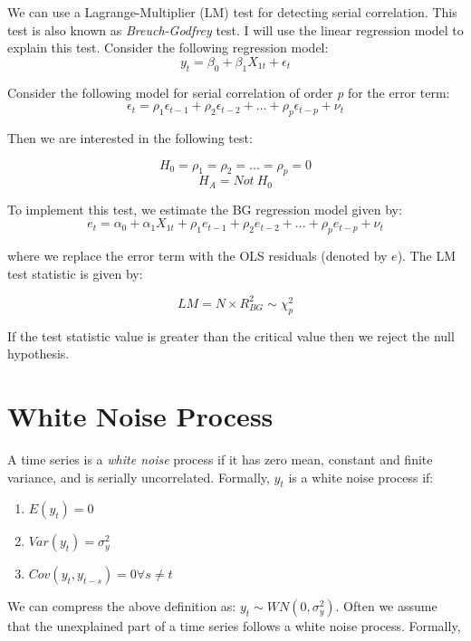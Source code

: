 \documentclass[]{book}
\providecommand{\tightlist}{%
  \setlength{\itemsep}{0pt}\setlength{\parskip}{0pt}}
\theoremstyle{definition}
\theoremstyle{definition}
\theoremstyle{definition}
\theoremstyle{remark}
\begin{document}
We can use a Lagrange-Multiplier (LM) test for detecting serial correlation. This test is also known as \emph{Breuch-Godfrey} test. I will use the linear regression model to explain this test. Consider the following regression model:
\begin{equation}
y_t=\beta_0 + \beta_1 X_{1t}+\epsilon_t
\end{equation}

Consider the following model for serial correlation of order \emph{p} for the error term:
\begin{equation}
\epsilon_t=\rho_1 \epsilon_{t-1}+\rho_2 \epsilon_{t-2}+...+ \rho_p \epsilon_{t-p}+\nu_t
\label{eq:bg}
\end{equation}

Then we are interested in the following test:

\[H_0=\rho_1=\rho_2=...=\rho_p=0 \]
\[H_A = Not \ H_0 \]

To implement this test, we estimate the BG regression model given by:
\begin{equation}
e_t=\alpha_0 + \alpha_1 X_{1t}+ \rho_1 e_{t-1}+\rho_2 e_{t-2}+...+ \rho_p e_{t-p}+\nu_t
\label{eq:bg1}
\end{equation}

where we replace the error term with the OLS residuals (denoted by \(e\)). The LM test statistic is given by:

\[ LM  = N\times R^2_{BG}  \sim \chi^2_p  \]

If the test statistic value is greater than the critical value then we reject the null hypothesis.

\hypertarget{white-noise-process}{%
\section{White Noise Process}\label{white-noise-process}}

A time series is a \emph{white noise} process if it has zero mean, constant and finite variance, and is serially uncorrelated. Formally, \(y_t\) is a white noise process if:

\begin{enumerate}
\def\labelenumi{\arabic{enumi}.}
\tightlist
\item
  \(E(y_t)=0\)
\item
  \(Var(y_t)=\sigma^2_y\)
\item
  \(Cov(y_t,y_{t-s})= 0 \forall s\neq t\)
\end{enumerate}

We can compress the above definition as: \(y_t\sim WN(0,\sigma^2_y)\).
Often we assume that the unexplained part of a time series follows a white noise process. Formally,
\end{document}
